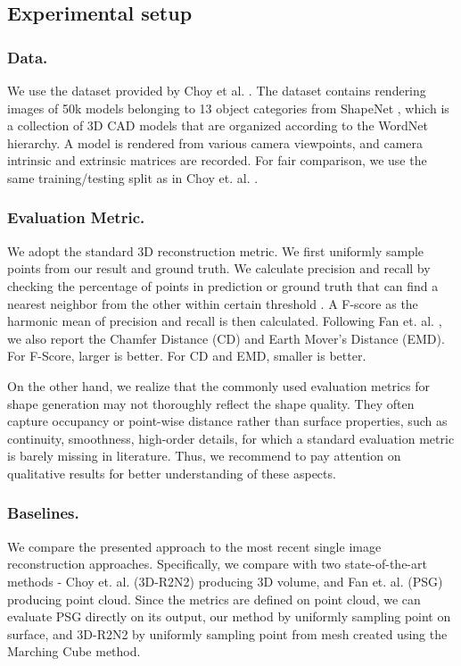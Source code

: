 \documentclass[runningheads]{llncs}
\begin{document}
\subsection{Experimental setup}
\subsubsection{Data.}
We use the dataset provided by Choy et al. \cite{ChoyXGCS16}. The dataset contains rendering images of 50k models belonging to 13 object categories from ShapeNet \cite{ChangFGHHLSSSSX15}, which is a collection of 3D CAD models that are organized according to the WordNet hierarchy.
A model is rendered from various camera viewpoints, and camera intrinsic and extrinsic matrices are recorded.
For fair comparison, we use the same training/testing split as in Choy et. al. \cite{ChoyXGCS16}.



\subsubsection{Evaluation Metric.} 
We adopt the standard 3D reconstruction metric.
We first uniformly sample points from our result and ground truth. We calculate precision and recall by checking the percentage of points in prediction or ground truth that can find a nearest neighbor from the other within certain threshold . A F-score \cite{KnapitschPZK17} as the harmonic mean of precision and recall is then calculated.
Following Fan et. al. \cite{FanSG16}, we also report the Chamfer Distance (CD) and Earth Mover's Distance (EMD). For F-Score, larger is better. For CD and EMD, smaller is better.

On the other hand, we realize that the commonly used evaluation metrics for shape generation may not thoroughly reflect the shape quality. They often capture occupancy or point-wise distance rather than surface properties, such as continuity, smoothness, high-order details, for which a standard evaluation metric is barely missing in literature. Thus, we recommend to pay attention on qualitative results for better understanding of these aspects.

\subsubsection{Baselines.} We compare the presented approach to the most recent single image reconstruction approaches. Specifically, we compare with two state-of-the-art methods - Choy et. al. \cite{ChoyXGCS16} (3D-R2N2) producing 3D volume, and Fan et. al. \cite{FanSG16} (PSG) producing point cloud.
Since the metrics are defined on point cloud, we can evaluate PSG directly on its output, our method by uniformly sampling point on surface, and 3D-R2N2 by uniformly sampling point from mesh created using the Marching Cube \cite{LorensenC87} method.
\end{document}
